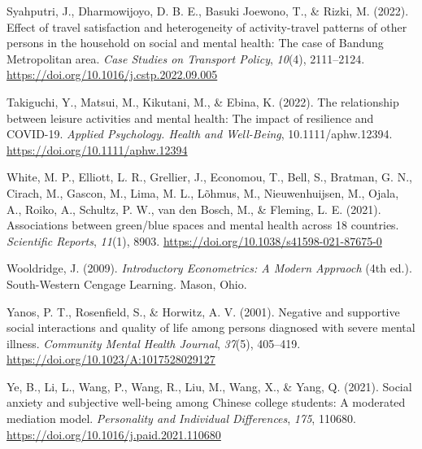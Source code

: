 \documentclass[
  letterpaper,
  number,
  review,
  3p]{elsarticle}
\newlength{\cslhangindent}
\newenvironment{CSLReferences}[2] %
 {\begin{list}{}{%
  \setlength{\itemindent}{0pt}
  \setlength{\leftmargin}{0pt}
  \setlength{\parsep}{0pt}
  \ifodd #1
   \setlength{\leftmargin}{\cslhangindent}
   \setlength{\itemindent}{-1\cslhangindent}
  \fi
  \setlength{\itemsep}{#2\baselineskip}}}
 {\end{list}}
\begin{document}
\begin{CSLReferences}{1}{0}
Syahputri, J., Dharmowijoyo, D. B. E., Basuki Joewono, T., \& Rizki, M.
(2022). Effect of travel satisfaction and heterogeneity of
activity-travel patterns of other persons in the household on social and
mental health: {The} case of {Bandung Metropolitan} area. \emph{Case
Studies on Transport Policy}, \emph{10}(4), 2111--2124.
\url{https://doi.org/10.1016/j.cstp.2022.09.005}

Takiguchi, Y., Matsui, M., Kikutani, M., \& Ebina, K. (2022). The
relationship between leisure activities and mental health: {The} impact
of resilience and {COVID}-19. \emph{Applied Psychology. Health and
Well-Being}, 10.1111/aphw.12394.
\url{https://doi.org/10.1111/aphw.12394}

White, M. P., Elliott, L. R., Grellier, J., Economou, T., Bell, S.,
Bratman, G. N., Cirach, M., Gascon, M., Lima, M. L., Lõhmus, M.,
Nieuwenhuijsen, M., Ojala, A., Roiko, A., Schultz, P. W., van den Bosch,
M., \& Fleming, L. E. (2021). Associations between green/blue spaces and
mental health across 18 countries. \emph{Scientific Reports},
\emph{11}(1), 8903. \url{https://doi.org/10.1038/s41598-021-87675-0}

Wooldridge, J. (2009). \emph{Introductory {Econometrics}: {A Modern
Appraoch}} (4th ed.). South-Western Cengage Learning. Mason, Ohio.

Yanos, P. T., Rosenfield, S., \& Horwitz, A. V. (2001). Negative and
supportive social interactions and quality of life among persons
diagnosed with severe mental illness. \emph{Community Mental Health
Journal}, \emph{37}(5), 405--419.
\url{https://doi.org/10.1023/A:1017528029127}

Ye, B., Li, L., Wang, P., Wang, R., Liu, M., Wang, X., \& Yang, Q.
(2021). Social anxiety and subjective well-being among {Chinese} college
students: {A} moderated mediation model. \emph{Personality and
Individual Differences}, \emph{175}, 110680.
\url{https://doi.org/10.1016/j.paid.2021.110680}

\end{CSLReferences}
\end{document}
